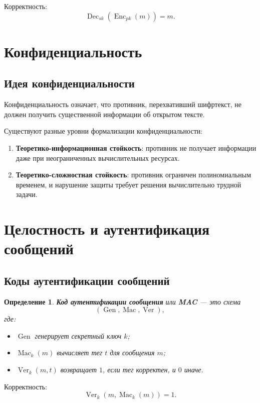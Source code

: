 \documentclass[12pt,a4paper]{article}
\newtheorem{definition}{Определение}
\DeclareMathOperator{\Enc}{Enc}
\DeclareMathOperator{\Dec}{Dec}
\DeclareMathOperator{\Gen}{Gen}
\DeclareMathOperator{\Ver}{Ver}
\DeclareMathOperator{\Mac}{Mac}
\begin{document}
Корректность:
\[
    \Dec_{sk}(\Enc_{pk}(m)) = m.
\]

\section{Конфиденциальность}

\subsection{Идея конфиденциальности}

Конфиденциальность означает, что противник, перехвативший шифртекст, не должен получить существенной информации об открытом тексте.

Существуют разные уровни формализации конфиденциальности:

\begin{enumerate}
    \item \textbf{Теоретико-информационная стойкость}: противник не получает информации даже при неограниченных вычислительных ресурсах.
    \item \textbf{Теоретико-сложностная стойкость}: противник ограничен полиномиальным временем, и нарушение защиты требует решения вычислительно трудной задачи.
\end{enumerate}

\section{Целостность и аутентификация сообщений}

\subsection{Коды аутентификации сообщений}

\begin{definition}
\textbf{Код аутентификации сообщения} или \textbf{MAC} --- это схема
\[
    (\Gen,\Mac,\Ver),
\]
где:
\begin{itemize}
    \item $\Gen$ генерирует секретный ключ $k$;
    \item $\Mac_k(m)$ вычисляет тег $t$ для сообщения $m$;
    \item $\Ver_k(m,t)$ возвращает $1$, если тег корректен, и $0$ иначе.
\end{itemize}
\end{definition}

Корректность:
\[
    \Ver_k(m,\Mac_k(m)) = 1.
\]
\end{document}
